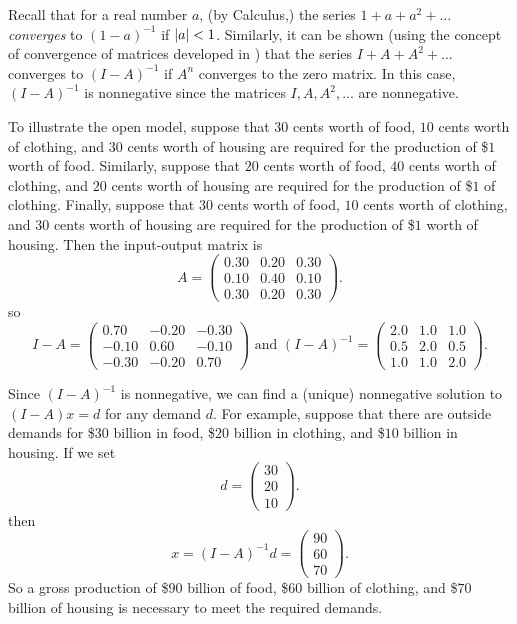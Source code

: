 Recall that for a real number \(a\), (by Calculus,) the series \(1 + a + a^2 + ...\) \emph{converges} to \((1 - a)^{-1}\) if \(\lvert a\rvert < 1\).
Similarly, it can be shown (using the concept of convergence of matrices developed in ) that the series \(I + A + A^2 + ...\) converges to \((I - A)^{-1}\) if \(A^n\) converges to the zero matrix.
In this case, \((I - A)^{-1}\) is nonnegative since the matrices \(I, A, A^2, ...\) are nonnegative.

To illustrate the open model, suppose that \(30\) cents worth of food, \(10\) cents worth of clothing, and \(30\) cents worth of housing are required for the production of \$\(1\) worth of food.
Similarly, suppose that \(20\) cents worth of food, \(40\) cents worth of clothing, and \(20\) cents worth of housing are required for the production of \$\(1\) of clothing.
Finally, suppose that \(30\) cents worth of food, \(10\) cents worth of clothing, and \(30\) cents worth of housing are required
for the production of \$\(1\) worth of housing. 
Then the input-output matrix is
\[
    A = \begin{pmatrix}
        0.30 & 0.20 & 0.30 \\
        0.10 & 0.40 & 0.10 \\
        0.30 & 0.20 & 0.30
    \end{pmatrix}.
\]
so
\[
    I - A = \left(\begin{array}{rrr}
        0.70 & -0.20 & -0.30 \\
        -0.10 & 0.60 & -0.10 \\
        -0.30 & -0.20 & 0.70
    \end{array}\right)
    \text { and }
    (I - A)^{-1} = \left(\begin{array}{lll}
        2.0 & 1.0 & 1.0 \\
        0.5 & 2.0 & 0.5 \\
        1.0 & 1.0 & 2.0
    \end{array}\right).
\]

Since \((I - A)^{-1}\) is nonnegative, we can find a (unique) nonnegative solution to \((I - A)x = d\) for any demand \(d\).
For example, suppose that there are outside demands for \$\(30\) billion in food, \$\(20\) billion in clothing, and \$\(10\) billion in housing.
If we set
\[
    d = \begin{pmatrix} 30 \\ 20 \\ 10 \end{pmatrix}.
\]
then
\[
    x = (I - A)^{-1}d = \begin{pmatrix} 90 \\ 60 \\ 70 \end{pmatrix}.
\]
So a gross production of \$\(90\) billion of food, \$\(60\) billion of clothing, and \$\(70\) billion of housing is necessary to meet the required demands.

